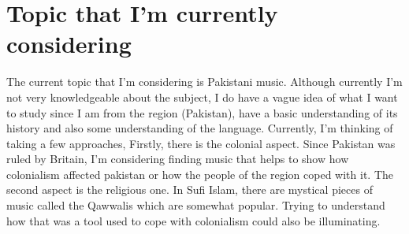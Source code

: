 \documentclass{article}
\begin{document}
  \section{Topic that I'm currently considering}

  The current topic that I'm considering is Pakistani music. Although currently
  I'm not very knowledgeable about the subject, I do have a vague idea of what I
  want to study since I am from the region (Pakistan), have a basic
  understanding of its history and also some understanding of the language.
  Currently, I'm thinking of taking a few approaches, Firstly, there is the
  colonial aspect. Since Pakistan was ruled by Britain, I'm considering finding
  music that helps to show how colonialism affected pakistan or how the people
  of the region coped with it. The second aspect is the religious one. In Sufi
  Islam, there are mystical pieces of music called the Qawwalis which are
  somewhat popular. Trying to understand how that was a tool used to cope with
  colonialism could also be illuminating. 

  \nocite{*}
  \printbibliography
\end{document}
